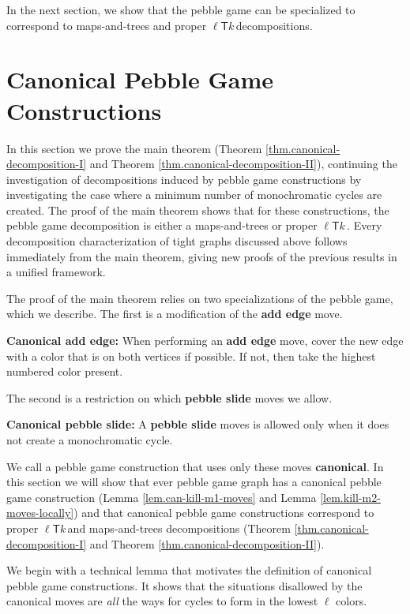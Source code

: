 \documentclass[11pt]{article}
\newcommand{\ellteekay}{\ensuremath{\ell{\mathsf T}k}\,}
\newcommand{\reflem}[1]{Lemma \ref{lem.#1}}
\newcommand{\refthm}[1]{Theorem \ref{thm.#1}}
\begin{document}
In the next section, we show that the pebble game can be specialized to correspond
to maps-and-trees and proper \ellteekay decompositions.

\section{Canonical Pebble Game Constructions}
In this section we prove the main theorem (\refthm{canonical-decomposition-I} and \refthm{canonical-decomposition-II}), continuing the investigation of decompositions 
induced by pebble game constructions by investigating the 
case where a minimum number of monochromatic cycles are created.  The proof of the
main theorem shows that for these constructions, the pebble game decomposition is 
either a maps-and-trees or proper \ellteekay.
Every decomposition characterization of tight graphs discussed above follows immediately from
the main theorem, giving new proofs of the previous results in a unified framework.

The proof of the main theorem relies on two specializations of the pebble game, which 
we describe.  The first is a modification of the {\bf add edge} move.

{\bf Canonical add edge:} When performing an {\bf add edge} move, cover the new edge with 
a color that is on both vertices if possible.  If not, then take the highest 
numbered color present.

The second is a restriction on which {\bf pebble slide} moves we allow.

{\bf Canonical pebble slide:} A {\bf pebble slide} moves is allowed only when it does
not create a monochromatic cycle.

We call a pebble game construction that uses only these moves {\bf canonical}.  In this section
we will show that ever pebble game graph has a canonical pebble game construction 
(\reflem{can-kill-m1-moves} and \reflem{kill-m2-moves-locally}) and that canonical 
pebble game constructions correspond to proper \ellteekay and maps-and-trees decompositions
(\refthm{canonical-decomposition-I} and \refthm{canonical-decomposition-II}).

We begin with a technical lemma that motivates the definition of canonical 
pebble game constructions.  It shows that the situations disallowed by 
the canonical moves are {\it all} the ways for cycles to form in 
the lowest $\ell$ colors.
\end{document}
